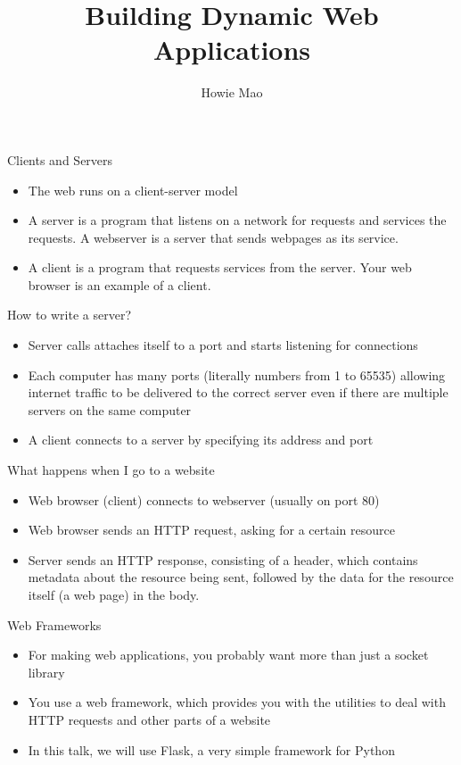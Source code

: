 \documentclass{beamer}
\title{Building Dynamic Web Applications}
\author{Howie Mao}
\begin{document}
\begin{frame}
	\titlepage
\end{frame}

\begin{frame}{Clients and Servers}
	\begin{itemize}
		\item The web runs on a client-server model
		\item A server is a program that listens on a network for requests
			and services the requests. A webserver is a server that sends
			webpages as its service.
		\item A client is a program that requests services from the server.
			Your web browser is an example of a client.
	\end{itemize}
\end{frame}

\begin{frame}{How to write a server?}
	\begin{itemize}
		\item Server calls attaches itself to a port and starts listening 
			for connections
		\item Each computer has many ports (literally numbers from 1 to 65535) 
			allowing internet traffic to be delivered to the correct
			server even if there are multiple servers on the same computer
		\item A client connects to a server by specifying its address and port
	\end{itemize}
\end{frame}

\begin{frame}{What happens when I go to a website}
	\begin{itemize}
		\item Web browser (client) connects to webserver (usually on port 80)
		\item Web browser sends an HTTP request, asking for a certain resource
		\item Server sends an HTTP response, consisting of a header,
			which contains metadata about the resource being sent, followed
			by the data for the resource itself (a web page) in the body.
	\end{itemize}
\end{frame}

\begin{frame}{Web Frameworks}
	\begin{itemize}
		\item For making web applications, you probably want more than just
			a socket library
		\item You use a web framework, which provides you with the utilities
			to deal with HTTP requests and other parts of a website
		\item In this talk, we will use Flask, a very simple framework for Python
	\end{itemize}
\end{frame}
\end{document}
